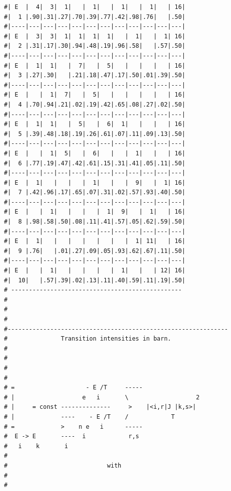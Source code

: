 \begin{enumerate}
{\begin{verbatim}
#| E  |  4|  3|  1|   |  1|   |  1|   |  1|   | 16|
#|  1 |.90|.31|.27|.70|.39|.77|.42|.98|.76|   |.50|
#|----|---|---|---|---|---|---|---|---|---|---|---|
#| E  |  3|  3|  1|  1|  1|  1|   |  1|   |  1| 16|
#|  2 |.31|.17|.30|.94|.48|.19|.96|.58|   |.57|.50|
#|----|---|---|---|---|---|---|---|---|---|---|---|
#| E  |  1|  1|   |  7|   |  5|   |   |   |   | 16|
#|  3 |.27|.30|   |.21|.18|.47|.17|.50|.01|.39|.50|
#|----|---|---|---|---|---|---|---|---|---|---|---|
#| E  |   |  1|  7|   |  5|   |   |   |   |   | 16|
#|  4 |.70|.94|.21|.02|.19|.42|.65|.08|.27|.02|.50|
#|----|---|---|---|---|---|---|---|---|---|---|---|
#| E  |  1|  1|   |  5|   |  6|  1|   |   |   | 16|
#|  5 |.39|.48|.18|.19|.26|.61|.07|.11|.09|.13|.50|
#|----|---|---|---|---|---|---|---|---|---|---|---|
#| E  |   |  1|  5|   |  6|   |   |  1|   |   | 16|
#|  6 |.77|.19|.47|.42|.61|.15|.31|.41|.05|.11|.50|
#|----|---|---|---|---|---|---|---|---|---|---|---|
#| E  |  1|   |   |   |  1|   |   |  9|   |  1| 16|
#|  7 |.42|.96|.17|.65|.07|.31|.02|.57|.93|.40|.50|
#|----|---|---|---|---|---|---|---|---|---|---|---|
#| E  |   |  1|   |   |   |  1|  9|   |  1|   | 16|
#|  8 |.98|.58|.50|.08|.11|.41|.57|.05|.62|.59|.50|
#|----|---|---|---|---|---|---|---|---|---|---|---|
#| E  |  1|   |   |   |   |   |   |  1| 11|   | 16|
#|  9 |.76|   |.01|.27|.09|.05|.93|.62|.67|.11|.50|
#|----|---|---|---|---|---|---|---|---|---|---|---|
#| E  |   |  1|   |   |   |   |  1|   |   | 12| 16|
#|  10|   |.57|.39|.02|.13|.11|.40|.59|.11|.19|.50|
# ------------------------------------------------ 
#
#
#
#-------------------------------------------------------------- 
#               Transition intensities in barn.                
#                                                              
#                                                              
#                                                              
#                                                              
# =                    - E /T     -----                        
# |                   e   i       \                   2        
# |     = const --------------     >    |<i,r|J |k,s>|         
# |             ----    - E /T    /            T               
# =             >    n e   i      -----                        
#  E -> E       ----  i            r,s                         
#   i    k       i                                             
#                                                              
#                            with                              
#                                                              
#                                                              

\end{verbatim}}
\end{enumerate}
